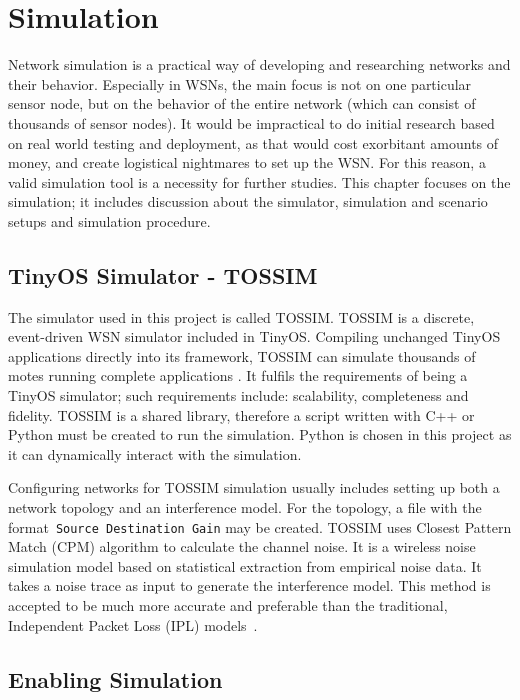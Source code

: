 \chapter{Simulation}
\label{Sim}
Network simulation is a practical way of developing and researching networks and their
behavior. Especially in WSNs, the main focus is not on one particular sensor node, but on
the behavior of the entire network (which can consist of thousands of sensor nodes). It would
be impractical to do initial research based on real world testing and deployment, as that would cost exorbitant amounts of money, and create logistical nightmares to set up the WSN. For this reason, a valid
simulation tool is a necessity for further studies. This chapter focuses on the simulation; it 
includes discussion about the simulator, simulation and scenario setups and simulation procedure.

\section{TinyOS Simulator - TOSSIM}
\label{Sim:TOSSIM}

The simulator used in this project is called TOSSIM\@. TOSSIM is a discrete, event-driven WSN simulator included in TinyOS. Compiling unchanged TinyOS applications
directly into its framework, TOSSIM can simulate thousands of motes running complete
applications \cite{LLWC}. It fulfils the requirements of being a TinyOS simulator; such requirements include: scalability, completeness and fidelity. TOSSIM is a shared library, therefore a script written with C++ or Python must be created to run the simulation.  Python is chosen in this project as it can dynamically interact with the simulation.
\newline

Configuring networks for TOSSIM simulation usually includes setting
up both a network topology and an interference model. For the topology, a file with the format~\texttt{Source Destination Gain} may be created. TOSSIM uses Closest Pattern Match (CPM) algorithm to calculate the channel noise. It is a wireless noise simulation model
based on statistical extraction from empirical noise data. It takes a noise trace as input to generate the interference model. This method is accepted to be much more accurate and preferable than the traditional, Independent Packet Loss (IPL) models~\cite{TOSSIM}.

\section{Enabling Simulation}
\label{Sim:Enabling}

